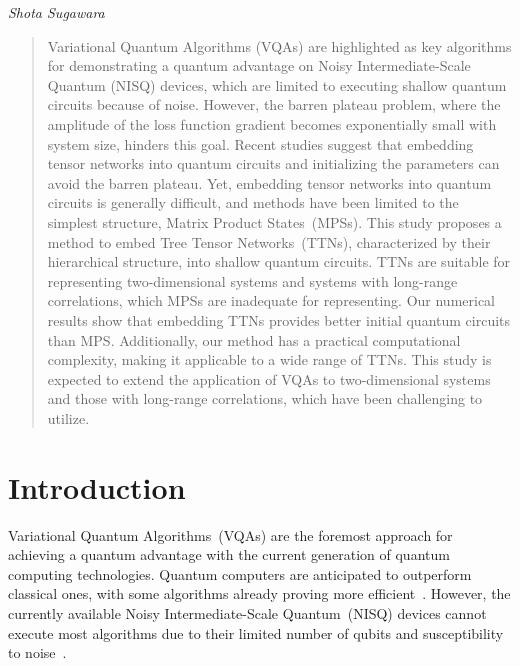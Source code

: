 \documentclass[12pt,dvipdfmx,twoside,openright]{report}
\begin{document}
\bigskip
\begin{flushright}
\textit{Shota Sugawara}
\end{flushright}
\thispagestyle{empty} 

\cleardoublepage
\begin{abstract}
    Variational Quantum Algorithms (VQAs) are highlighted as key algorithms for demonstrating a quantum advantage on Noisy Intermediate-Scale Quantum (NISQ) devices, which are limited to executing shallow quantum circuits because of noise.
However, the barren plateau problem, where the amplitude of the loss function gradient becomes exponentially small with system size, hinders this goal.
Recent studies suggest that embedding tensor networks into quantum circuits and initializing the parameters can avoid the barren plateau.
Yet, embedding tensor networks into quantum circuits is generally difficult, and methods have been limited to the simplest structure, Matrix Product States~(MPSs).
This study proposes a method to embed Tree Tensor Networks~(TTNs), characterized by their hierarchical structure, into shallow quantum circuits.
TTNs are suitable for representing two-dimensional systems and systems with long-range correlations, which MPSs are inadequate for representing.
Our numerical results show that embedding TTNs provides better initial quantum circuits than MPS.
Additionally, our method has a practical computational complexity, making it applicable to a wide range of TTNs.
This study is expected to extend the application of VQAs to two-dimensional systems and those with long-range correlations, which have been challenging to utilize.
\end{abstract}


\tableofcontents
\thispagestyle{empty}





\cleardoublepage
\chapter{Introduction}
Variational Quantum Algorithms~(VQAs) are the foremost approach for achieving a quantum advantage with the current generation of quantum computing technologies.
Quantum computers are anticipated to outperform classical ones, with some algorithms already proving more efficient~\cite{shor1994algorithms,grover1996fast}.
However, the currently available Noisy Intermediate-Scale Quantum~(NISQ) devices cannot execute most algorithms due to their limited number of qubits and susceptibility to noise~\cite{nisq}.
\end{document}
